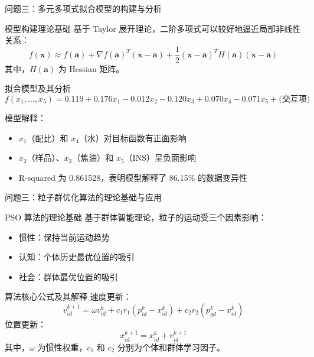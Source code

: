 \documentclass{beamer}
\begin{document}
\begin{frame}{问题三：多元多项式拟合模型的构建与分析}
    \scriptsize
    \begin{block}{模型构建理论基础}
        基于 Taylor 展开理论，二阶多项式可以较好地逼近局部非线性关系：
        \[
            f(\mathbf{x}) \approx f(\mathbf{a}) + \nabla f(\mathbf{a})^T(\mathbf{x}-\mathbf{a}) + \frac{1}{2}(\mathbf{x}-\mathbf{a})^T H(\mathbf{a})(\mathbf{x}-\mathbf{a})
        \]
        其中，$H(\mathbf{a})$ 为 Hessian 矩阵。
    \end{block}
    \begin{block}{拟合模型及其分析}
        \scriptsize
        \[
            f(x_1,\ldots,x_5) = 0.119 + 0.176x_1 - 0.012x_2 - 0.120x_3 + 0.070x_4 - 0.071x_5 + \text{(交互项)}
        \]
        
        模型解释：
        \begin{itemize}
            \item $x_1$（配比）和 $x_4$（水）对目标函数有正面影响
            \item $x_2$（样品）、$x_3$（焦油）和 $x_5$（INS）呈负面影响
            \item R-squared 为 0.861528，表明模型解释了 86.15\% 的数据变异性
        \end{itemize}
    \end{block}
\end{frame}

\begin{frame}{问题三：粒子群优化算法的理论基础与应用}
    \scriptsize
    \begin{block}{PSO 算法的理论基础}
        基于群体智能理论，粒子的运动受三个因素影响：
        \begin{itemize}
            \item 惯性：保持当前运动趋势
            \item 认知：个体历史最优位置的吸引
            \item 社会：群体最优位置的吸引
        \end{itemize}
    \end{block}
    \begin{block}{算法核心公式及其解释}
        速度更新：
        \[
            v_{id}^{k+1} = \omega v_{id}^k + c_1r_1(p_{id}^k - x_{id}^k) + c_2r_2(p_{gd}^k - x_{id}^k)
        \]
        位置更新：
        \[
            x_{id}^{k+1} = x_{id}^k + v_{id}^{k+1}
        \]
        其中，$\omega$ 为惯性权重，$c_1$ 和 $c_2$ 分别为个体和群体学习因子。
    \end{block}
\end{frame}
\end{document}

